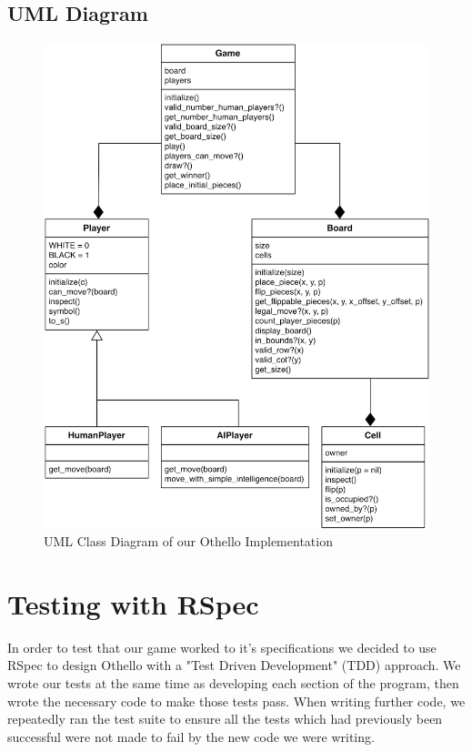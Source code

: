 \documentclass[a4wide, 11pt]{article}
\begin{document}
  \subsection{UML Diagram}
  \begin{figure}[H]
    \begin{center}
      \includegraphics[scale=0.75]{"UML Diagram"}
      \caption{UML Class Diagram of our Othello Implementation}
    \end{center}
  \end{figure}

  \section{Testing with RSpec}
  In order to test that our game worked to it's specifications we decided to use RSpec to design Othello with a "Test Driven Development" (TDD) approach. We wrote our tests at the same time as developing each section of the program, then wrote the necessary code to make those tests pass. When writing further code, we repeatedly ran the test suite to ensure all the tests which had previously been successful were not made to fail by the new code we were writing.
\end{document}
